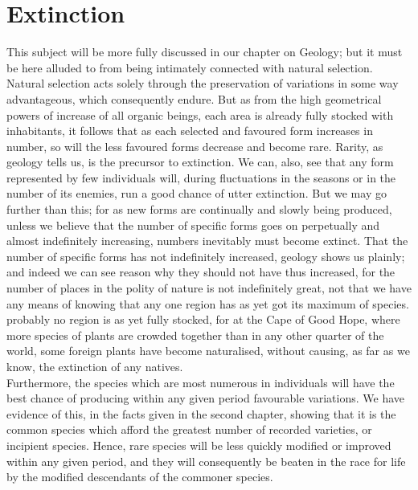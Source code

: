 \section{Extinction}
\indent This subject will be more fully discussed in our chapter on Geology; but it must be here alluded to from being intimately connected with natural selection. Natural selection acts solely through the preservation of variations in some way advantageous, which consequently endure. But as from the high geometrical powers of increase of all organic beings, each area is already fully stocked with inhabitants, it follows that as each selected and favoured form increases in number, so will the less favoured forms decrease and become rare. Rarity, as geology tells us, is the precursor to extinction. We can, also, see that any form represented by few individuals will, during fluctuations in the seasons or in the number of its enemies, run a good chance of utter extinction. But we may go further than this; for as new forms are continually and slowly being produced, unless we believe that the number of specific forms goes on perpetually and almost indefinitely increasing, numbers inevitably must become extinct. That the number of specific forms has not indefinitely increased, geology shows us plainly; and indeed we can see reason why they should not have thus increased, for the number of places in the polity of nature is not indefinitely great, not that we have any means of knowing that any one region has as yet got its maximum of species.  probably no region is as yet fully stocked, for at the Cape of Good Hope, where more species of plants are crowded together than in any other quarter of the world, some foreign plants have become naturalised, without causing, as far as we know, the extinction of any natives. \\
\indent Furthermore, the species which are most numerous in individuals will have the best chance of producing within any given period favourable variations. We have evidence of this, in the facts given in the second chapter, showing that it is the common species which afford the greatest number of recorded varieties, or incipient species.  Hence, rare species will be less quickly modified or improved within any given period, and they will consequently be beaten in the race for life by the modified descendants of the commoner species. \\
